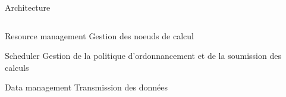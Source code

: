 \documentclass{beamer}
\begin{document}
\begin{frame}{Architecture}
\begin{columns}
	\begin{column}[r]{0.5\linewidth}
        \begin{block}{Resource management}
            Gestion des noeuds de calcul
        \end{block}
        \begin{alertblock}{Scheduler}
             Gestion de la politique d'ordonnancement et de la soumission des calculs
        \end{alertblock}
        \begin{exampleblock}{Data management}
            Transmission des données
        \end{exampleblock}
        
	\end{column}
	\end{columns}
\end{frame}
\end{document}
